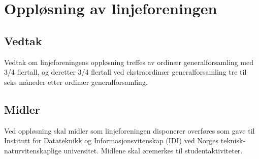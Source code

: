 \chapter{Oppløsning av linjeforeningen}
\section{Vedtak}

Vedtak om linjeforeningens oppløsning treffes av ordinær generalforsamling med 3/4 flertall, og deretter 3/4 flertall ved ekstraordinær generalforsamling tre til seks måneder etter ordinær generalforsamling.

\section{Midler}

Ved oppløsning skal midler som linjeforeningen disponerer overføres som gave til \mbox{Institutt} for Datateknikk og Informasjonsvitenskap (IDI) ved Norges teknisk-\linebreak naturvitenskaplige universitet. Midlene skal øremerkes til studentaktiviteter.
